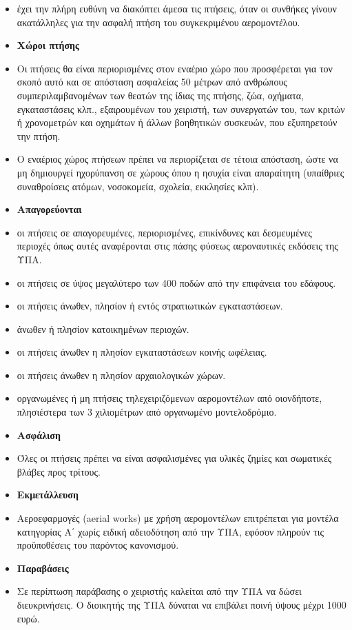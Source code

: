 \documentclass[a4paper, 12pt, twoside]{report}
\begin{document}
{{{{{{{\begin{itemize}
				\item έχει την πλήρη ευθύνη να διακόπτει άμεσα τις πτήσεις, όταν οι συνθήκες γίνουν ακατάλληλες για την ασφαλή πτήση του συγκεκριμένου αερομοντέλου.
				\item \textbf{Χώροι πτήσης}
				\item Οι πτήσεις θα είναι περιορισμένες στον εναέριο χώρο που προσφέρεται για τον σκοπό αυτό και σε απόσταση ασφαλείας 50 μέτρων από ανθρώπους συμπεριλαμβανομένων των θεατών της ίδιας της πτήσης, ζώα, οχήματα, εγκαταστάσεις κλπ., εξαιρουμένων του χειριστή, των συνεργατών του, των κριτών ή χρονομετρών και οχημάτων ή άλλων βοηθητικών συσκευών, που
εξυπηρετούν την πτήση.
				\item Ο εναέριος χώρος πτήσεων πρέπει να περιορίζεται σε τέτοια απόσταση, ώστε να μη δημιουργεί ηχορύπανση σε χώρους όπου η ησυχία είναι απαραίτητη (υπαίθριες συναθροίσεις ατόμων, νοσοκομεία, σχολεία,
εκκλησίες κλπ).
				\item \textbf{Απαγορεύονται}
				\item οι πτήσεις σε απαγορευμένες, περιορισμένες, επικίνδυνες και δεσμευμένες περιοχές όπως αυτές αναφέρονται στις πάσης φύσεως αεροναυτικές εκδόσεις της ΥΠΑ.
				\item οι πτήσεις σε ύψος μεγαλύτερο των 400 ποδών από την επιφάνεια του εδάφους.
				\item οι πτήσεις άνωθεν, πλησίον ή εντός στρατιωτικών εγκαταστάσεων.
				\item άνωθεν ή πλησίον κατοικημένων περιοχών.
				\item οι πτήσεις άνωθεν η πλησίον εγκαταστάσεων κοινής ωφέλειας.
				\item οι πτήσεις άνωθεν η πλησίον αρχαιολογικών χώρων.
				\item οργανωμένες ή μη πτήσεις τηλεχειριζόμενων αερομοντέλων από οιονδήποτε, πλησιέστερα των 3 χιλιομέτρων από οργανωμένο μοντελοδρόμιο.
				\item \textbf{Ασφάλιση}
				\item Όλες οι πτήσεις πρέπει να είναι ασφαλισμένες για υλικές ζημίες και σωματικές βλάβες προς τρίτους.
				\item \textbf{Εκμετάλλευση}
				\item Αεροεφαρμογές (aerial works) με χρήση αερομοντέλων επιτρέπεται για μοντέλα κατηγορίας Α΄ χωρίς ειδική αδειοδότηση από την ΥΠΑ, εφόσον πληρούν τις προϋποθέσεις του παρόντος κανονισμού.
				\item \textbf{Παραβάσεις}
				\item Σε περίπτωση παράβασης ο χειριστής καλείται από την ΥΠΑ να δώσει διευκρινήσεις. Ο διοικητής της ΥΠΑ δύναται να επιβάλει ποινή ύψους μέχρι 1000 ευρώ.
			\end{itemize}
			}
			
}}}}}}
\end{document}
